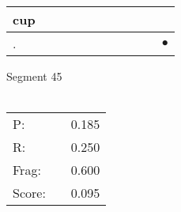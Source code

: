 \documentclass[landscape]{article}
\newcommand{\ssp}{\hspace{2pt}}
\newcommand{\mex}{\cellcolor{g}$\bullet$}
\begin{document}
\begin{tabular}{|l|p{10pt}|p{10pt}|p{10pt}|p{10pt}|p{10pt}|p{10pt}|p{10pt}|p{10pt}|p{10pt}|p{10pt}|}
\hline
\ssp cup \ssp&\hspace{2pt}&\hspace{2pt}&\hspace{2pt}&\hspace{2pt}&\hspace{2pt}&\hspace{2pt}&\hspace{2pt}&\hspace{2pt}&\hspace{2pt}&\hspace{2pt}\\
\hline
\ssp \cellcolor{ref9}. \ssp&\hspace{2pt}&\hspace{2pt}&\hspace{2pt}&\hspace{2pt}&\hspace{2pt}&\hspace{2pt}&\hspace{2pt}&\hspace{2pt}&\hspace{2pt}&\hspace{2pt}\mex\\
\hline
\end{tabular}

\vspace{6pt}
\noindent Segment 45\\\\
\noindent\begin{tabular}{lm{12pt}r}
\hline
P:&&0.185\\
R:&&0.250\\
Frag:&&0.600\\
Score:&&0.095\\
\end{tabular}

\newpage
\end{document}
